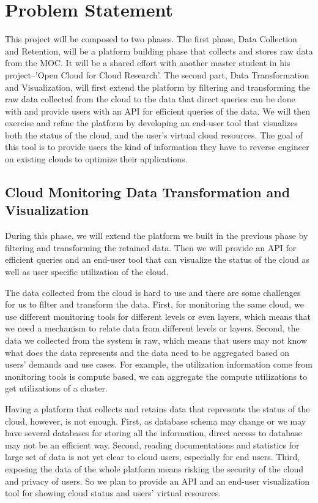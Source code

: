 \section{Problem Statement}
\label{sec:ProblemStatement}



This project will be composed to two phases. The first phase, Data Collection and Retention, will be a platform building phase that collects and stores raw data from the MOC. It will be a shared effort with another master student in his project--'Open Cloud for Cloud Research'.  
The second part, Data Transformation and Visualization, will first extend the platform by filtering and transforming the raw data collected from the cloud to the data that direct queries can be done with and provide users with an API for efficient queries of the data. We will then exercise and refine the platform by developing an end-user tool that visualizes both the status of the cloud, and the user’s virtual cloud resources. The goal of this tool is to provide users the kind of information they have to reverse engineer on existing clouds to optimize their applications.



\subsection{Cloud Monitoring Data Transformation and Visualization}
During this phase, we will extend the platform we built in the previous phase by filtering and transforming the retained data. Then we will provide an API  for efficient queries and an end-user tool that can visualize the status of the cloud as well as user specific utilization of the cloud.  

The data collected from the cloud is hard to use and there are some challenges for us to filter and transform the data. First, for monitoring the same cloud, we use different monitoring tools for different levels or even layers, which means that we need a mechanism to relate data from different levels or layers. Second, the data we collected from the system is raw, which means that users may not know what does the data represents and the data need to be aggregated based on users’ demands and use cases. For example, the utilization information come from monitoring tools is compute based, we can aggregate the compute utilizations to get utilizations of a cluster. 

Having a platform that collects and retains data that represents the status of the cloud, however, is not enough. First, as database schema may change or we may have several databases for storing all the information, direct access to database may not be an efficient way. Second, reading documentations and statistics for large set of data is not yet clear to cloud users, especially for end users. Third, exposing the data of the whole platform means risking the security of the cloud and privacy of users. So we plan to provide an API and an end-user visualization tool for showing cloud status and users’ virtual resources. 